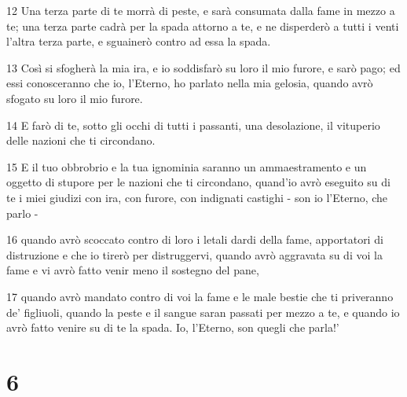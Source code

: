 \par 12 Una terza parte di te morrà di peste, e sarà consumata dalla fame in mezzo a te; una terza parte cadrà per la spada attorno a te, e ne disperderò a tutti i venti l'altra terza parte, e sguainerò contro ad essa la spada.
\par 13 Così si sfogherà la mia ira, e io soddisfarò su loro il mio furore, e sarò pago; ed essi conosceranno che io, l'Eterno, ho parlato nella mia gelosia, quando avrò sfogato su loro il mio furore.
\par 14 E farò di te, sotto gli occhi di tutti i passanti, una desolazione, il vituperio delle nazioni che ti circondano.
\par 15 E il tuo obbrobrio e la tua ignominia saranno un ammaestramento e un oggetto di stupore per le nazioni che ti circondano, quand'io avrò eseguito su di te i miei giudizi con ira, con furore, con indignati castighi - son io l'Eterno, che parlo -
\par 16 quando avrò scoccato contro di loro i letali dardi della fame, apportatori di distruzione e che io tirerò per distruggervi, quando avrò aggravata su di voi la fame e vi avrò fatto venir meno il sostegno del pane,
\par 17 quando avrò mandato contro di voi la fame e le male bestie che ti priveranno de' figliuoli, quando la peste e il sangue saran passati per mezzo a te, e quando io avrò fatto venire su di te la spada. Io, l'Eterno, son quegli che parla!'

\chapter{6}

